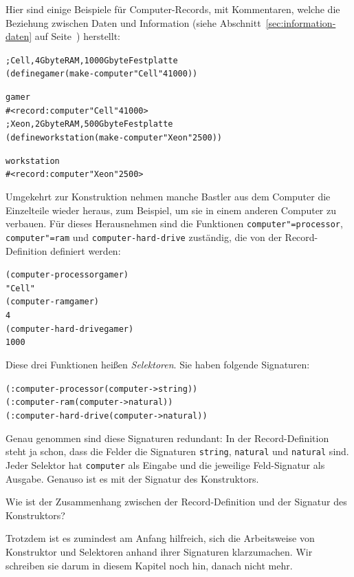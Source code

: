 Hier sind einige Beispiele für Computer-Records, mit Kommentaren,
welche die Beziehung zwischen Daten und Information (siehe
Abschnitt~\ref{sec:information-daten} auf
Seite~\pageref{sec:information-daten}) herstellt:
%
\begin{alltt}
; Cell, 4 Gbyte RAM, 1000 Gbyte Festplatte
(define gamer (make-computer "Cell" 4 1000))

gamer
\evalsto{} #<record:computer "Cell" 4 1000>
; Xeon, 2 Gbyte RAM, 500 Gbyte Festplatte
(define workstation (make-computer "Xeon" 2 500))

workstation
\evalsto{} #<record:computer "Xeon" 2 500>
\end{alltt}
%
Umgekehrt zur Konstruktion nehmen manche Bastler aus dem Computer die
Einzelteile wieder heraus, zum Beispiel, um sie in einem anderen
Computer zu verbauen. Für dieses Herausnehmen sind die Funktionen
\texttt{computer"=processor}, \texttt{computer"=ram} und
\texttt{computer-hard-drive} zuständig, die von der
Record-Definition definiert werden:
%
\begin{alltt}
(computer-processor gamer)
\evalsto{} "Cell"
(computer-ram gamer)
\evalsto{} 4
(computer-hard-drive gamer)
\evalsto{} 1000
\end{alltt}
%
Diese drei Funktionen heißen \textit{Selektoren}.  Sie haben
folgende Signaturen:
%
\begin{alltt}
(: computer-processor (computer -> string))
(: computer-ram (computer -> natural))
(: computer-hard-drive (computer -> natural))
\end{alltt}
%
Genau genommen sind diese Signaturen redundant: In der
Record-Definition steht ja schon, dass die Felder die Signaturen
\texttt{string}, \texttt{natural} und \texttt{natural} sind.  Jeder
Selektor hat \texttt{computer} als Eingabe und die jeweilige
Feld-Signatur als Ausgabe.  Genauso ist es mit der Signatur des
Konstruktors.
%
\begin{aufgabe}
  Wie ist der Zusammenhang zwischen der Record-Definition und der
  Signatur des Konstruktors?
\end{aufgabe}
%
Trotzdem ist es zumindest am Anfang hilfreich, sich die Arbeitsweise
von Konstruktor und Selektoren anhand ihrer Signaturen klarzumachen.
Wir schreiben sie darum in diesem Kapitel noch hin, danach nicht mehr.

